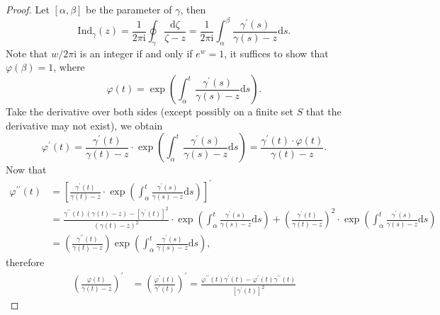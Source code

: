 \begin{proof}
Let $[\alpha,\beta]$ be the parameter of $\gamma$, then 
$$
\mathrm{Ind}_{\gamma}\left( z \right) =\frac{1}{2\pi \mathrm{i}}\oint_{\gamma}{\frac{\mathrm{d}\zeta}{\zeta -z}}=\frac{1}{2\pi \mathrm{i}}\int_{\alpha}^{\beta}{\frac{\gamma ^{\prime}\left( s \right)}{\gamma \left( s \right) -z}\mathrm{d}s}.
$$
Note that $w/2\pi\mathrm{i}$ is an integer if and only if $e^w=1$, it suffices to show that $\varphi(\beta)=1$, where 
$$
\varphi \left( t \right) =\exp \left( \int_{\alpha}^t{\frac{\gamma ^{\prime}\left( s \right)}{\gamma \left( s \right) -z}\mathrm{d}s} \right) .
$$
Take the derivative over both sides (except possibly on a finite set $S$ that the derivative may not exist), we obtain 
$$
\varphi ^{\prime}\left( t \right) =\frac{\gamma ^{\prime}\left( t \right)}{\gamma \left( t \right) -z}\cdot \exp \left( \int_{\alpha}^t{\frac{\gamma ^{\prime}\left( s \right)}{\gamma \left( s \right) -z}\mathrm{d}s} \right) =\frac{\gamma ^{\prime}\left( t \right) \cdot \varphi \left( t \right)}{\gamma \left( t \right) -z}.
$$
Now that 
$$
\begin{aligned}
\varphi ^{\prime\prime}\left( t \right) &=\left[ \frac{\gamma ^{\prime}\left( t \right)}{\gamma \left( t \right) -z}\cdot \exp \left( \int_{\alpha}^t{\frac{\gamma ^{\prime}\left( s \right)}{\gamma \left( s \right) -z}\mathrm{d}s} \right) \right] ^{\prime}
\\
&=\frac{\gamma ^{\prime\prime}\left( t \right) \left( \gamma \left( t \right) -z \right) -\left[ \gamma ^{\prime}\left( t \right) \right] ^2}{\left( \gamma \left( t \right) -z \right) ^2}\cdot \exp \left( \int_{\alpha}^t{\frac{\gamma ^{\prime}\left( s \right)}{\gamma \left( s \right) -z}\mathrm{d}s} \right) +\left( \frac{\gamma ^{\prime}\left( t \right)}{\gamma \left( t \right) -z} \right) ^2\cdot \exp \left( \int_{\alpha}^t{\frac{\gamma ^{\prime}\left( s \right)}{\gamma \left( s \right) -z}\mathrm{d}s} \right) 
\\
&=\left( \frac{\gamma ^{\prime\prime}\left( t \right)}{\gamma \left( t \right) -z} \right) \exp \left( \int_{\alpha}^t{\frac{\gamma ^{\prime}\left( s \right)}{\gamma \left( s \right) -z}\mathrm{d}s} \right) ,
\end{aligned}
$$
therefore 
$$
\begin{aligned}
\left( \frac{\varphi \left( t \right)}{\gamma \left( t \right) -z} \right) ^{\prime}&=\left( \frac{\varphi ^{\prime}\left( t \right)}{\gamma ^{\prime}\left( t \right)} \right) ^{\prime}=\frac{\varphi ^{\prime\prime}\left( t \right) \gamma ^{\prime}\left( t \right) -\varphi ^{\prime}\left( t \right) \gamma ^{\prime\prime}\left( t \right)}{\left[ \gamma ^{\prime}\left( t \right) \right] ^2}

\end{aligned}$$
\end{proof}
